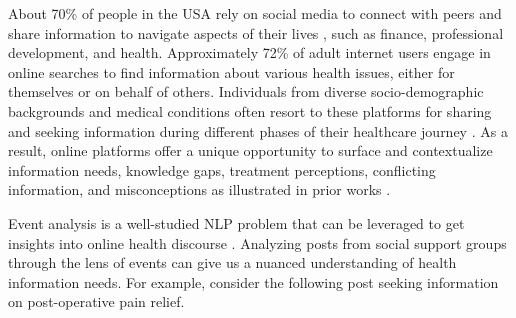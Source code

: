 \documentclass[letterpaper]{article} %
\begin{document}
About 70\% of people in the USA rely on social media to connect with peers and share information to navigate aspects of their lives \cite{kanchan2023social}, such as finance, professional development, and health. Approximately 72\% of adult internet users engage in online searches to find information about various health issues, either for themselves or on behalf of others. Individuals from diverse socio-demographic backgrounds and medical conditions often resort to these platforms for sharing and seeking information during different phases of their healthcare journey \cite{Neely2021-ji}. As a result, online platforms offer a unique opportunity to surface and contextualize information needs, knowledge gaps, treatment perceptions, conflicting information, and misconceptions as illustrated in prior works \cite{EDOOSAGIE2020103770,chen2021social,gatto2023scope, acm_review}.



Event analysis is a well-studied NLP problem that can be leveraged to get insights into online health discourse \cite{ma-etal-2023-dice, naik-etal-2017-extracting}. Analyzing posts from social support groups through the lens of events can give us a nuanced understanding of health information needs. For example, consider the following post seeking information on post-operative pain relief. 

\end{document}
